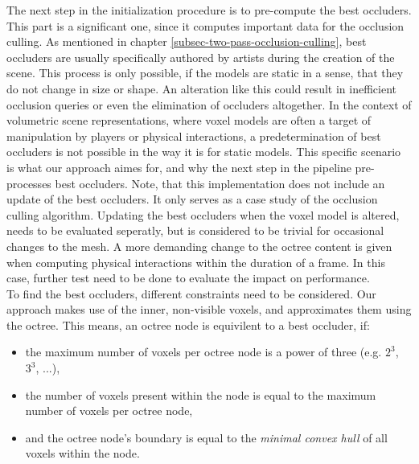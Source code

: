 The next step in the initialization procedure is to pre-compute the best occluders. This part is a significant one, 
since it computes important data for the occlusion culling. As mentioned in chapter \ref{subsec-two-pass-occlusion-culling},
best occluders are usually specifically authored by artists during the creation of the scene. This process is only 
possible, if the models are static in a sense, that they do not change in size or shape. An alteration like this 
could result in inefficient occlusion queries or even the elimination of occluders altogether. In the context of 
volumetric scene representations, where voxel models are often a target of manipulation by players or physical 
interactions, a predetermination of best occluders is not possible in the way it is for static models.
This specific scenario is what our approach aimes for, and why the next step in the pipeline pre-processes best 
occluders. Note, that this implementation does not include an update of the best occluders. It only serves as a 
case study of the occlusion culling algorithm. Updating the best occluders when the voxel model is altered, 
needs to be evaluated seperatly, but is considered to be trivial for occasional changes to the mesh. A more 
demanding change to the octree content is given when computing physical interactions within the duration of a frame.
In this case, further test need to be done to evaluate the impact on performance. \\

\noindent
To find the best occluders, different constraints need to be considered. Our approach makes use of the inner, non-visible 
voxels, and approximates them using the octree. This means, an octree node is equivilent to a best occluder, if:

\begin{itemize}
    \item the maximum number of voxels per octree node is a power of three (e.g. $2^{3}$,  $3^{3}$, ...),
    \item the number of voxels present within the node is equal to the maximum number of voxels per octree node,
    \item and the octree node's boundary is equal to the \emph{minimal convex hull} of all voxels within the node.
\end{itemize}

